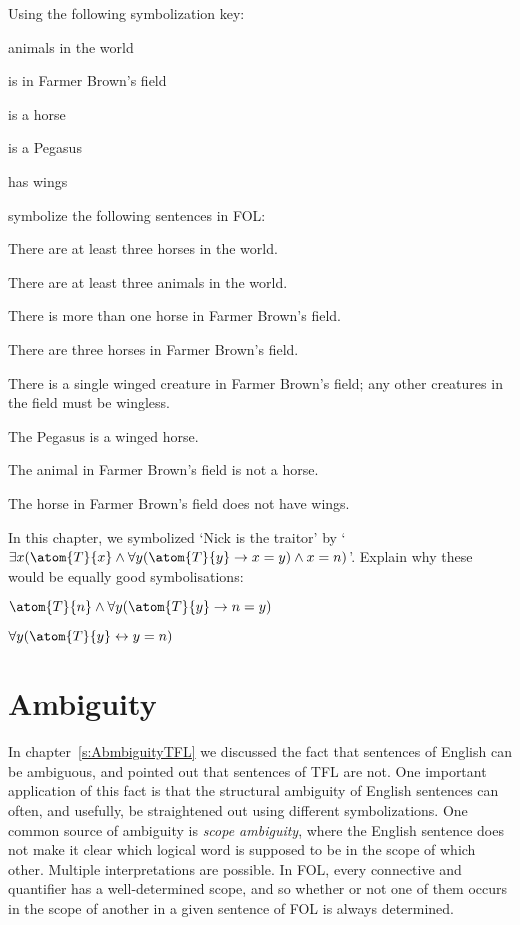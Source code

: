 \problempart Using the following symbolization key:
\begin{ekey}
\item[\text{domain}] animals in the world
\item[\atom{B}{x}]  is in Farmer Brown's field
\item[\atom{H}{x}]  is a horse
\item[\atom{P}{x}]  is a Pegasus
\item[\atom{W}{x}]  has wings
\end{ekey}
symbolize the following sentences in FOL:
\begin{earg}
\item There are at least three horses in the world.
\item There are at least three animals in the world.
\item There is more than one horse in Farmer Brown's field.
\item There are three horses in Farmer Brown's field.
\item There is a single winged creature in Farmer Brown's field; any other creatures in the field must be wingless.
\item The Pegasus is a winged horse.
\item The animal in Farmer Brown's field is not a horse.
\item The horse in Farmer Brown's field does not have wings.
\end{earg}

\problempart
In this chapter, we symbolized `Nick is the traitor' by `$\exists x (\atom{T}{x} \eand \forall y(\atom{T}{y} \eif x = y) \eand x = n)$'. Explain why these would be equally good symbolisations:
	\begin{ebullet}
		\item $\atom{T}{n} \eand \forall y(\atom{T}{y} \eif n = y)$
		\item $\forall y(\atom{T}{y} \eiff y = n)$
	\end{ebullet}


\chapter{Ambiguity}\label{s:ambiguityFOL}

In chapter~\ref{s:AbmbiguityTFL} we discussed the fact that sentences of English can be ambiguous, and pointed out that sentences of TFL are not. One important application of this fact is that the structural ambiguity of English sentences can often, and usefully, be straightened out using different symbolizations.  One common source of ambiguity is \emph{scope ambiguity}, where the English sentence does not make it clear which logical word is supposed to be in the scope of which other. Multiple interpretations are possible.  In FOL, every connective and quantifier has a well-determined scope, and so whether or not one of them occurs in the scope of another in a given sentence of FOL is always determined.

